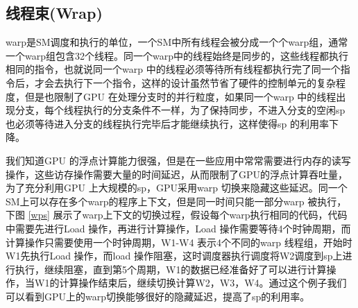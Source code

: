 \subsection{线程束(Wrap)}
warp是SM调度和执行的单位，一个SM中所有线程会被分成一个个warp组，通常一个warp组包含32个线程。同一个warp中的线程始终是同步的，这些线程都执行相同的指令，也就说同一个warp 中的线程必须等待所有线程都执行完了同一个指令后，才会去执行下一个指令，这样的设计虽然节省了硬件的控制单元的复杂程度，但是也限制了GPU 在处理分支时的并行粒度，如果同一个warp 中的线程出现分支，每个线程执行的分支条件不一样，为了保持同步，不进入分支的空闲sp 也必须等待进入分支的线程执行完毕后才能继续执行，这样使得sp 的利用率下降。

我们知道GPU 的浮点计算能力很强，但是在一些应用中常常需要进行内存的读写操作，这些访存操作需要大量的时间延迟，从而限制了GPU的浮点计算吞吐量，为了充分利用GPU 上大规模的sp，GPU采用warp 切换来隐藏这些延迟。同一个SM上可以存在多个warp的程序上下文，但是同一时间只能一部分warp 被执行，下图 \ref{wps} 展示了warp上下文的切换过程，假设每个warp执行相同的代码，代码中需要先进行Load 操作，再进行计算操作，Load 操作需要等待4个时钟周期，而计算操作只需要使用一个时钟周期，W1-W4 表示4个不同的warp 线程组，开始时W1先执行Load 操作，而load 操作阻塞，这时调度器执行调度将W2调度到sp上进行执行，继续阻塞，直到第5个周期，W1的数据已经准备好了可以进行计算操作，当W1的计算操作结束后，继续切换计算W2，W3，W4。通过这个例子我们可以看到GPU上的warp切换能够很好的隐藏延迟，提高了sp的利用率。

